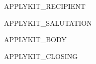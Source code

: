 \documentclass[12pt]{letter}
\begin{document}
\begin{letter}{{{APPLYKIT_RECIPIENT}}}

\opening{{{APPLYKIT_SALUTATION}}}

{{APPLYKIT_BODY}}

\closing{{{APPLYKIT_CLOSING}}}

\end{letter}
\end{document}
